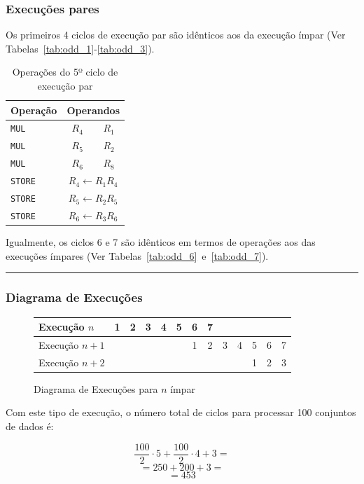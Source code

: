\begin{multicols}{2}
	\subsubsection{Execuções pares}

	Os primeiros 4 ciclos de execução par são idênticos aos da execução ímpar (Ver Tabelas~\ref{tab:odd_1}-\ref{tab:odd_3}).

	\begin{table}[H]
		\centering
		\begin{tabular}{l|c|c}
			Operação & \multicolumn{2}{c}{Operandos} \\
			\hline
			\texttt{MUL} & $R_4$ & $R_1$ \\
			\texttt{MUL} & $R_5$ & $R_2$ \\
			\texttt{MUL} & $R_6$ & $R_8$ \\
			\hline
			\texttt{STORE} & \multicolumn{2}{c}{$R_4\leftarrow R_1R_4$} \\
			\texttt{STORE} & \multicolumn{2}{c}{$R_5\leftarrow R_2R_5$} \\
			\texttt{STORE} & \multicolumn{2}{c}{$R_6\leftarrow R_3R_6$} \\
		\end{tabular}
		\caption{Operações do 5º ciclo de execução par}
		\label{tab:even_5}
	\end{table}

	Igualmente, os ciclos 6 e 7 são idênticos em termos de operações aos das execuções ímpares (Ver Tabelas~\ref{tab:odd_6}~e~\ref{tab:odd_7}).

\end{multicols}
\noindent\rule{\linewidth}{0.4pt}


\subsubsection{Diagrama de Execuções}

\begin{figure}[H]
	\centering
	\begin{tabular}{|l||c|c|c|c|c|c|c|c|c|c|c|c|}
		\hline
		Execução $n$ & 1 & 2 & 3 & 4 & 5 & 6 & 7 &&&&&\\
		\hline
		Execução $n+1$ &&&&&& 1 & 2 & 3 & 4 & 5 & 6 & 7 \\
		\hline
		Execução $n+2$ &&&&&&&&&& 1 & 2 & 3 \\
		\hline
	\end{tabular}
	\caption{Diagrama de Execuções para $n$ ímpar}
	\label{fig:datapath_max_throughput}
\end{figure}

Com este tipo de execução, o número total de ciclos para processar 100 conjuntos de dados é:

\[ \frac{100}{2} \cdot 5 + \frac{100}{2} \cdot 4 + 3 = \]
\[= 250 + 200 + 3 =\]
\[= 453\]
